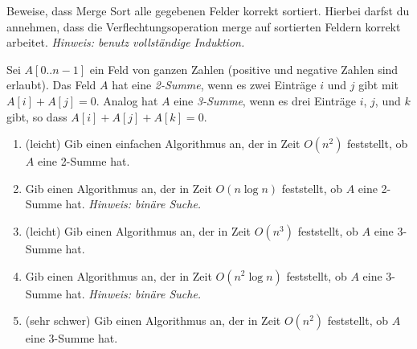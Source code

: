 \documentclass{uebung_cs}
\begin{document}
\begin{aufgabe}
	Beweise, dass Merge Sort alle gegebenen Felder korrekt sortiert. Hierbei darfst du annehmen, dass die Verflechtungsoperation merge auf sortierten Feldern korrekt arbeitet.
	\emph{Hinweis: benutz vollständige Induktion.}
\end{aufgabe}

\begin{aufgabe}
	Sei $A[0..n-1]$ ein Feld von ganzen Zahlen (positive und negative Zahlen sind erlaubt).
	Das Feld $A$ hat eine \emph{2-Summe}, wenn es zwei Einträge $i$ und $j$ gibt mit $A[i]+A[j]=0$.
	Analog hat $A$ eine \emph{3-Summe}, wenn es drei Einträge $i$, $j$, und $k$ gibt, so dass $A[i]+A[j]+A[k]=0$.
	\begin{enumerate}
		\item (leicht) Gib einen einfachen Algorithmus an, der in Zeit $O(n^2)$ feststellt, ob $A$ eine 2-Summe hat.
		\item Gib einen Algorithmus an, der in Zeit $O(n\log n)$ feststellt, ob $A$ eine 2-Summe hat. \emph{Hinweis: binäre Suche.}
		\item (leicht) Gib einen Algorithmus an, der in Zeit $O(n^3)$ feststellt, ob $A$ eine 3-Summe hat.
		\item Gib einen Algorithmus an, der in Zeit $O(n^2\log n)$ feststellt, ob $A$ eine 3-Summe hat. \emph{Hinweis: binäre Suche.}
		\item (sehr schwer) Gib einen Algorithmus an, der in Zeit $O(n^2)$ feststellt, ob $A$ eine 3-Summe hat.
	\end{enumerate}
\end{aufgabe}
\end{document}

